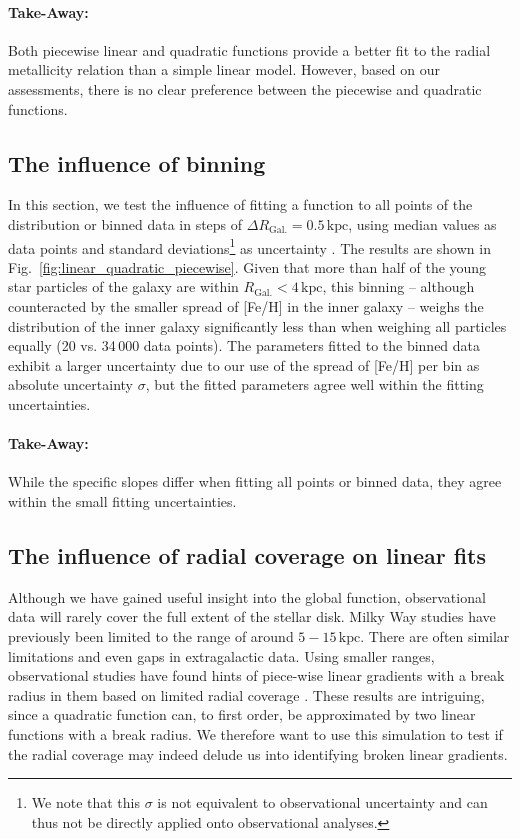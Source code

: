 \documentclass[fleqn,usenatbib]{mnras}
\begin{document}
\paragraph*{Take-Away:} Both piecewise linear and quadratic functions provide a better fit to the radial metallicity relation than a simple linear model. However, based on our assessments, there is no clear preference between the piecewise and quadratic functions.

\subsection{The influence of binning}
\label{sec:binning}

In this section, we test the influence of fitting a function to all points of the distribution or binned data in steps of $\Delta R_\mathrm{Gal.} = 0.5\,\mathrm{kpc}$, using median values as data points and standard deviations\footnote{We note that this $\sigma$ is not equivalent to observational uncertainty and can thus not be directly applied onto observational analyses.} as uncertainty \citep[see also][who fitted functions to radially binned IllustrisTNG data]{Hemler2021}. The results are shown in Fig.~\ref{fig:linear_quadratic_piecewise}. Given that more than half of the young star particles of the galaxy are within $R_\mathrm{Gal.} < 4\,\mathrm{kpc}$, this binning -- although counteracted by the smaller spread of [Fe/H] in the inner galaxy -- weighs the distribution of the inner galaxy significantly less than when weighing all particles equally (20 vs. 34\,000 data points). The parameters fitted to the binned data exhibit a larger uncertainty due to our use of the spread of [Fe/H] per bin as absolute uncertainty $\sigma$, but the fitted parameters agree well within the fitting uncertainties.

\paragraph*{Take-Away:} While the specific slopes differ when fitting all points or binned data, they agree within the small fitting uncertainties.

\subsection{The influence of radial coverage on linear fits}
\label{sec:radial_coverage}

Although we have gained useful insight into the global function, observational data will rarely cover the full extent of the stellar disk. Milky Way studies have previously been limited to the range of around $5-15\,\mathrm{kpc}$. There are often similar limitations and even gaps in extragalactic data. Using smaller ranges, observational studies have found hints of piece-wise linear gradients with a break radius in them based on limited radial coverage \citep[e.g.][]{Andrievsky2002, Yong2012, Boeche2013, Hayden2014, Anders2017, Donor2020, Chen2023}. These results are intriguing, since a quadratic function can, to first order, be approximated by two linear functions with a break radius. We therefore want to use this simulation to test if the radial coverage may indeed delude us into identifying broken linear gradients.
\end{document}
